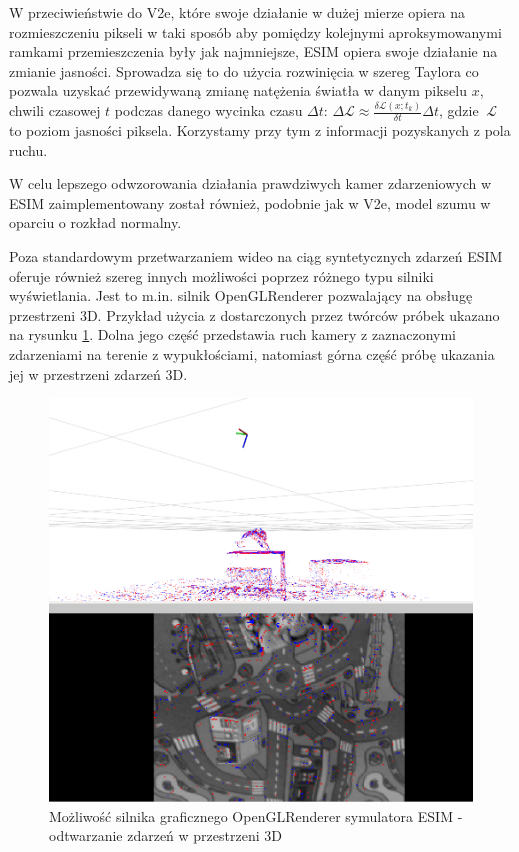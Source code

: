     W przeciwieństwie do V2e, które swoje działanie w dużej mierze opiera na rozmieszczeniu pikseli w taki sposób aby pomiędzy kolejnymi aproksymowanymi ramkami przemieszczenia były jak najmniejsze, ESIM opiera swoje działanie na zmianie jasności. Sprowadza się to do użycia rozwinięcia w szereg Taylora co pozwala uzyskać przewidywaną zmianę natężenia światła w danym pikselu \(x\), chwili czasowej \(t\) podczas danego wycinka czasu \(\Delta t\): \(\Delta \mathcal{L} \approx \frac{\delta \mathcal{L}(x;t_k)}{\delta t} \Delta t  \), gdzie \(\ \mathcal{L} \) to poziom jasności piksela. Korzystamy przy tym z informacji pozyskanych z pola ruchu.
    
    W celu lepszego odwzorowania działania prawdziwych kamer zdarzeniowych w ESIM zaimplementowany został również, podobnie jak w V2e, model szumu w oparciu o rozkład normalny.
    
    Poza standardowym przetwarzaniem wideo na ciąg syntetycznych zdarzeń ESIM oferuje również szereg innych możliwości poprzez różnego typu silniki wyświetlania. Jest to m.in. silnik OpenGLRenderer pozwalający na obsługę przestrzeni 3D. Przykład użycia z dostarczonych przez twórców próbek ukazano na rysunku \ref{fig:ESIM_3D}. Dolna jego część przedstawia ruch kamery z zaznaczonymi zdarzeniami na terenie z wypukłościami, natomiast górna część próbę ukazania jej w przestrzeni zdarzeń 3D.
    
    \begin{figure}
        \centering
        \includegraphics[width=\textwidth]{Codes/ESIM_test/3D_test.png}
        \caption{Możliwość silnika graficznego OpenGLRenderer symulatora ESIM - odtwarzanie zdarzeń w przestrzeni 3D}
        \label{fig:ESIM_3D}
    \end{figure}
    

